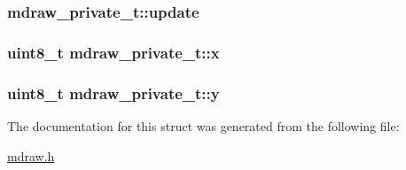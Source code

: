 \hypertarget{structmdraw__private__t_d5f03b668e3d05f874a444139012e770}{
\subsubsection{ {\bf mdraw\_\-private\_\-t::update}}}
\label{structmdraw__private__t_d5f03b668e3d05f874a444139012e770}


\hypertarget{structmdraw__private__t_adf8e80dbbed2ccb09cd4976bbe4bf29}{
\subsubsection{\setlength{\rightskip}{0pt plus 5cm}uint8\_\-t {\bf mdraw\_\-private\_\-t::x}}}
\label{structmdraw__private__t_adf8e80dbbed2ccb09cd4976bbe4bf29}


\hypertarget{structmdraw__private__t_da1b1d57274b60d599b0c069e91ca177}{
\subsubsection{\setlength{\rightskip}{0pt plus 5cm}uint8\_\-t {\bf mdraw\_\-private\_\-t::y}}}
\label{structmdraw__private__t_da1b1d57274b60d599b0c069e91ca177}




The documentation for this struct was generated from the following file:\begin{CompactItemize}
\item 
\hyperlink{mdraw_8h}{mdraw.h}\end{CompactItemize}
